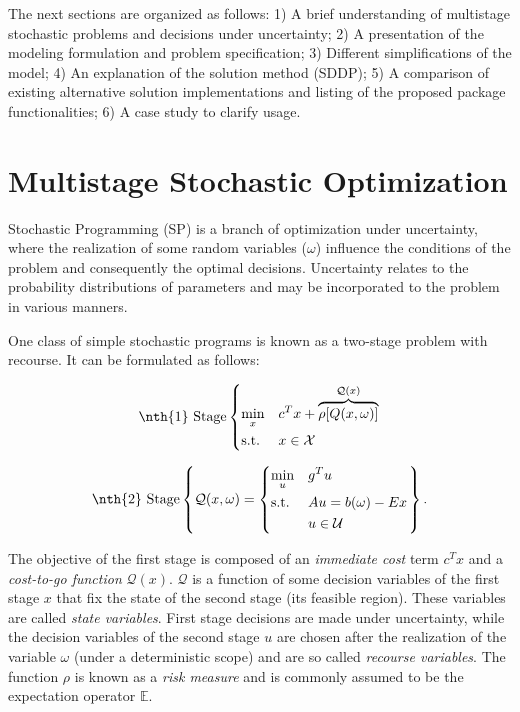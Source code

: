 \documentclass{juliacon}
\begin{document}
The next sections are organized as follows: 1) A brief understanding of multistage stochastic problems and decisions under uncertainty; 2) A presentation of the modeling formulation and problem specification; 3) Different simplifications of the model; 4) An explanation of the solution method (SDDP); 5) A comparison of existing alternative solution implementations and listing of the proposed package functionalities; 6) A case study to clarify usage.

\section{Multistage Stochastic Optimization}
\label{sec:multistochopt}

Stochastic Programming (SP) \cite{shapiro2009lectures} is a branch of optimization under uncertainty, where the realization of some random variables ($\omega$) influence the conditions of the problem and consequently the optimal decisions. Uncertainty relates to the probability distributions of parameters and may be incorporated to the problem in various manners. 

One class of simple stochastic programs is known as a two-stage problem with recourse. It can be formulated as follows:

\begin{equation*}
\nth{1} \text{ Stage} \left\{
\begin{aligned}
& \underset{x}{\text{min}}
& & c^T x + \overbrace{\rho[Q(x, \omega)]}^{\mathcal{Q}(x)} \\
& \text{s.t.}
& & x \in \mathcal{X}
\end{aligned}
\right.
\end{equation*}

\begin{equation*}
\nth{2} \text{ Stage} \left\{
\mathcal{Q}(x, \omega) = \left\{
\begin{aligned}
& \underset{u}{\text{min}}
& & g^T u \\
& \text{s.t.}
& & A u = b(\omega)- E x \\
& & & u \in \mathcal{U} 
\end{aligned}
\right. \right\}.
\end{equation*}

The objective of the first stage is composed of an \textit{immediate cost} term $c^T x$ and a \textit{cost-to-go function} $\mathcal{Q}(x)$. $\mathcal{Q}$ is a function of some decision variables of the first stage $x$ that fix the state of the second stage (its feasible region). These variables are called \textit{state variables}. First stage decisions are made under uncertainty, while the decision variables of the second stage $u$ are chosen after the realization of the variable $\omega$ (under a deterministic scope) and are so called \textit{recourse variables}. The function $\rho$ is known as a \textit{risk measure} \cite{artzner1999coherent} and is commonly assumed to be the expectation operator $\mathbb{E}$.
\end{document}
